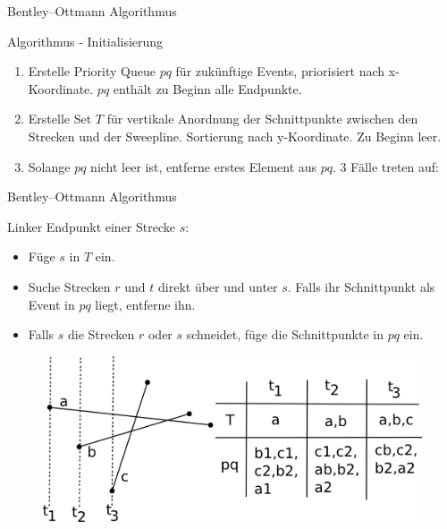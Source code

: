 \documentclass{beamer}
\begin{document}
\begin{frame}{Bentley–Ottmann Algorithmus}
	\begin{block}{Algorithmus - Initialisierung}
		\begin{enumerate}
			\item Erstelle Priority Queue $pq$ für zukünftige Events, priorisiert nach x-Koordinate. $pq$ enthält zu Beginn alle Endpunkte.
			\item Erstelle Set $T$ für vertikale Anordnung der Schnittpunkte zwischen den Strecken und der Sweepline. Sortierung nach y-Koordinate. Zu Beginn leer.
			\item Solange $pq$ nicht leer ist, entferne erstes Element aus $pq$. 3 Fälle treten auf:
		\end{enumerate}
	\end{block}
\end{frame}

\begin{frame}{Bentley–Ottmann Algorithmus}
	\begin{block}{Linker Endpunkt einer Strecke $s$:}
		\begin{itemize}
			\item Füge $s$ in $T$ ein.
			\item Suche Strecken $r$ und $t$ direkt über und unter $s$. Falls ihr Schnittpunkt als Event in $pq$ liegt, entferne ihn.
			\item Falls $s$ die Strecken $r$ oder $s$ schneidet, füge die Schnittpunkte in $pq$ ein.
		\end{itemize}
	\end{block}
	\begin{figure}
		\includegraphics[scale=0.8]{insert.png}\\
	\end{figure}
\end{frame}
\end{document}
